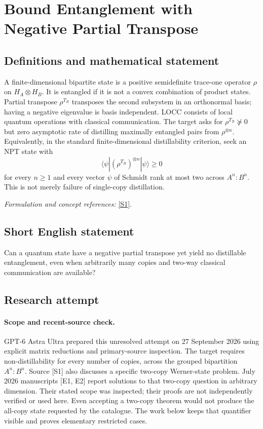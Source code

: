 \documentclass[11pt]{article}
\begin{document}
\section*{\texorpdfstring{Bound Entanglement with Negative Partial Transpose}{Bound Entanglement with Negative Partial Transpose}}\label{statement}
\subsection{Definitions and mathematical statement}
A finite-dimensional bipartite state is a positive semidefinite trace-one operator $\rho$ on $H_A\otimes H_B$. It is entangled if it is not a convex combination of product states. Partial transpose $\rho^{T_B}$ transposes the second subsystem in an orthonormal basis; having a negative eigenvalue is basis independent. LOCC consists of local quantum operations with classical communication. The target asks for $\rho^{T_B}\not\succeq0$ but zero asymptotic rate of distilling maximally entangled pairs from $\rho^{\otimes n}$. Equivalently, in the standard finite-dimensional distillability criterion, seek an NPT state with
\[
 \langle\psi|(\rho^{T_B})^{\otimes n}|\psi\rangle\ge0
\]
for every $n\ge1$ and every vector $\psi$ of Schmidt rank at most two across $A^n:B^n$. This is not merely failure of single-copy distillation.
\par\smallskip\textit{Formulation and concept references:} \href{https://arxiv.org/pdf/2002.03233}{[S1]}.

\subsection{Short English statement}
Can a quantum state have a negative partial transpose yet yield no distillable entanglement, even when arbitrarily many copies and two-way classical communication are available?
\subsection{Research attempt}
\paragraph{Scope and recent-source check.}
GPT-6 Astra Ultra prepared this unresolved attempt on 27 September 2026
using explicit matrix reductions and primary-source inspection. The
target requires non-distillability for every number of copies, across
the grouped bipartition $A^n:B^n$. Source [S1] also discusses a
specific two-copy Werner-state problem. July 2026 manuscripts [E1, E2]
report solutions to that two-copy question in arbitrary dimension.
Their stated scope was inspected; their proofs are not independently
verified or used here. Even accepting a two-copy theorem would not
produce the all-copy state requested by the catalogue. The work below
keeps that quantifier visible and proves elementary restricted cases.
\end{document}
